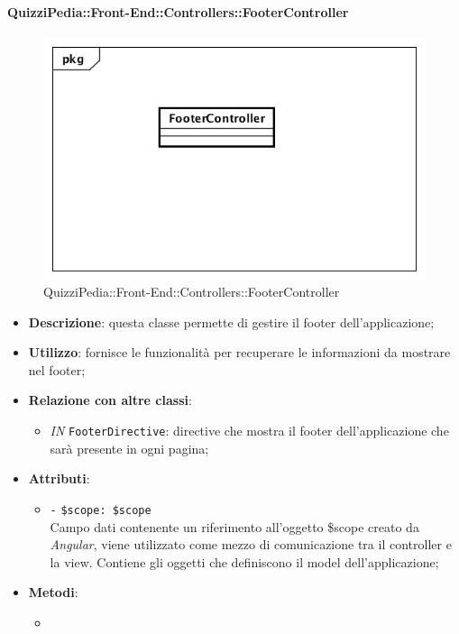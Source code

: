 \paragraph{QuizziPedia::Front-End::Controllers::FooterController}
\begin{figure}
	\centering
	\includegraphics[scale=0.45]{UML/Classi/Front-End/QuizziPedia_Front-end_Controller_FooterController.png}
	\caption{QuizziPedia::Front-End::Controllers::FooterController}
\end{figure}
\begin{itemize}
	\item \textbf{Descrizione}: questa classe permette di gestire il footer dell'applicazione;
	\item \textbf{Utilizzo}: fornisce le funzionalità per recuperare le informazioni da mostrare nel footer;
	\item \textbf{Relazione con altre classi}:
	\begin{itemize}
		\item \textit{IN} \texttt{FooterDirective}: directive che mostra il footer dell'applicazione che sarà presente in ogni pagina;  
	\end{itemize}
	\item \textbf{Attributi}:
	\begin{itemize}
		\item \texttt{-} \texttt{\$scope: \$scope} \\
		Campo dati contenente un riferimento all’oggetto \$scope creato da \textit{Angular}, viene utilizzato come mezzo di comunicazione tra il controller e la view. Contiene gli oggetti che definiscono il model dell’applicazione;
	\end{itemize}
	\item \textbf{Metodi}:
	\begin{itemize}
		\item 
	\end{itemize}
\end{itemize}

